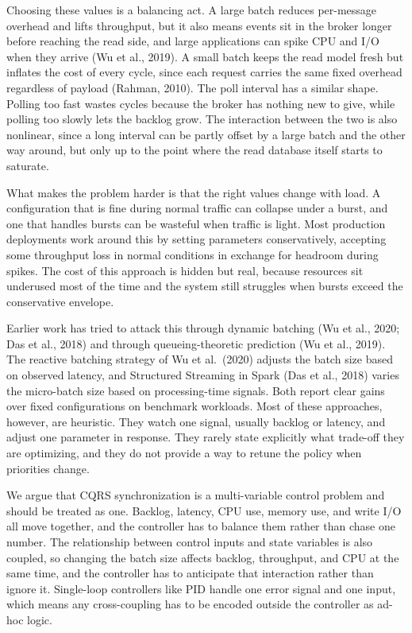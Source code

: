 \documentclass[10pt,a4paper]{article}
\begin{document}
Choosing these values is a balancing act. A large batch reduces per-message overhead and lifts throughput, but it also means events sit in the broker longer before reaching the read side, and large applications can spike CPU and I/O when they arrive (Wu et al., 2019). A small batch keeps the read model fresh but inflates the cost of every cycle, since each request carries the same fixed overhead regardless of payload (Rahman, 2010). The poll interval has a similar shape. Polling too fast wastes cycles because the broker has nothing new to give, while polling too slowly lets the backlog grow. The interaction between the two is also nonlinear, since a long interval can be partly offset by a large batch and the other way around, but only up to the point where the read database itself starts to saturate.

What makes the problem harder is that the right values change with load. A configuration that is fine during normal traffic can collapse under a burst, and one that handles bursts can be wasteful when traffic is light. Most production deployments work around this by setting parameters conservatively, accepting some throughput loss in normal conditions in exchange for headroom during spikes. The cost of this approach is hidden but real, because resources sit underused most of the time and the system still struggles when bursts exceed the conservative envelope.

Earlier work has tried to attack this through dynamic batching (Wu et al., 2020; Das et al., 2018) and through queueing-theoretic prediction (Wu et al., 2019). The reactive batching strategy of Wu et al.\ (2020) adjusts the batch size based on observed latency, and Structured Streaming in Spark (Das et al., 2018) varies the micro-batch size based on processing-time signals. Both report clear gains over fixed configurations on benchmark workloads. Most of these approaches, however, are heuristic. They watch one signal, usually backlog or latency, and adjust one parameter in response. They rarely state explicitly what trade-off they are optimizing, and they do not provide a way to retune the policy when priorities change.

We argue that CQRS synchronization is a multi-variable control problem and should be treated as one. Backlog, latency, CPU use, memory use, and write I/O all move together, and the controller has to balance them rather than chase one number. The relationship between control inputs and state variables is also coupled, so changing the batch size affects backlog, throughput, and CPU at the same time, and the controller has to anticipate that interaction rather than ignore it. Single-loop controllers like PID handle one error signal and one input, which means any cross-coupling has to be encoded outside the controller as ad-hoc logic.
\end{document}
